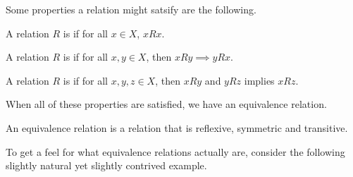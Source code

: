 Some properties a relation might satsify are the following.

\begin{definition}[Reflexive]
	A relation $R$ is  if for all $x \in X$, $x R x$.
\end{definition}

\begin{definition}[Symmetric]
	A relation $R$ is  if for all $x, y \in X$, then $xRy \implies y R x$.
\end{definition}

\begin{definition}[Transitive]
	A relation $R$ is  if for all $x, y, z \in X$, then $x R y$ and $y R z$ implies $x R z$.
\end{definition}

When all of these properties are satisfied, we have an equivalence relation.

\begin{definition}
	An equivalence relation is a relation that is reflexive, symmetric and transitive.
\end{definition}

To get a feel for what equivalence relations actually are, consider the following slightly natural yet slightly contrived example.

